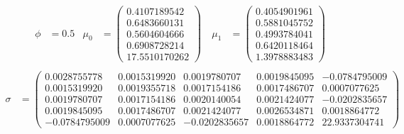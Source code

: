\begin{align*} \phi &= 0.5 &
 \mu_0 &= \begin{pmatrix} 0.4107189542\\
0.6483660131\\
0.5604604666\\
0.6908728214\\
17.5510170262 \end{pmatrix}\ &
 \mu_1 &= \begin{pmatrix} 0.4054901961\\
0.5881045752\\
0.4993784041\\
0.6420118464\\
1.3978883483 \end{pmatrix}\\
 \end{align*}
 \vspace{-\baselineskip}
 \begin{align*}
 \sigma &=
\begin{pmatrix} 0.0028755778&0.0015319920&0.0019780707&0.0019845095&-0.0784795009\\
0.0015319920&0.0019355718&0.0017154186&0.0017486707&0.0007077625\\
0.0019780707&0.0017154186&0.0020140054&0.0021424077&-0.0202835657\\
0.0019845095&0.0017486707&0.0021424077&0.0026534871&0.0018864772\\
-0.0784795009&0.0007077625&-0.0202835657&0.0018864772&22.9337304741
\end{pmatrix}
\end{align*}
